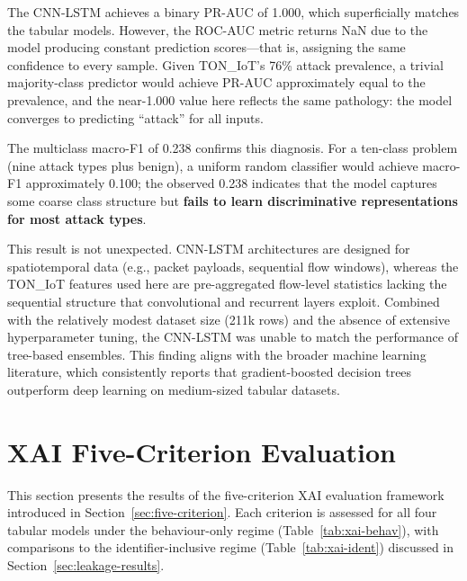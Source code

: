 \documentclass[12pt,a4paper]{report}
\begin{document}
The CNN-LSTM achieves a binary PR-AUC of 1.000, which superficially matches the tabular models. However, the ROC-AUC metric returns NaN due to the model producing constant prediction scores---that is, assigning the same confidence to every sample. Given TON\_IoT's 76\% attack prevalence, a trivial majority-class predictor would achieve PR-AUC approximately equal to the prevalence, and the near-1.000 value here reflects the same pathology: the model converges to predicting ``attack'' for all inputs.

The multiclass macro-F1 of 0.238 confirms this diagnosis. For a ten-class problem (nine attack types plus benign), a uniform random classifier would achieve macro-F1 approximately 0.100; the observed 0.238 indicates that the model captures some coarse class structure but \textbf{fails to learn discriminative representations for most attack types}.

This result is not unexpected. CNN-LSTM architectures are designed for spatiotemporal data (e.g., packet payloads, sequential flow windows), whereas the TON\_IoT features used here are pre-aggregated flow-level statistics lacking the sequential structure that convolutional and recurrent layers exploit. Combined with the relatively modest dataset size (211k rows) and the absence of extensive hyperparameter tuning, the CNN-LSTM was unable to match the performance of tree-based ensembles. This finding aligns with the broader machine learning literature, which consistently reports that gradient-boosted decision trees outperform deep learning on medium-sized tabular datasets.

\section{XAI Five-Criterion Evaluation}
\label{sec:xai-results}

This section presents the results of the five-criterion XAI evaluation framework introduced in Section~\ref{sec:five-criterion}. Each criterion is assessed for all four tabular models under the behaviour-only regime (Table~\ref{tab:xai-behav}), with comparisons to the identifier-inclusive regime (Table~\ref{tab:xai-ident}) discussed in Section~\ref{sec:leakage-results}.
\end{document}
